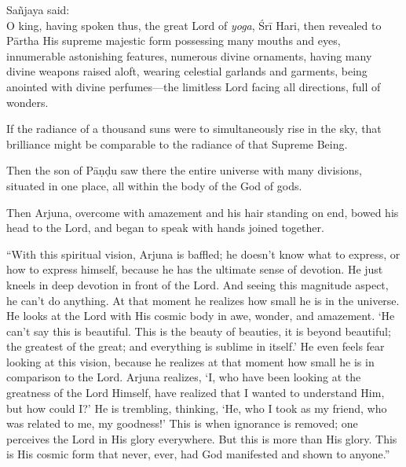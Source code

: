 {\hspace*{1em}Sañjaya said: \\
O king, having spoken thus, the great Lord of \textit{yoga}, Śrī Hari, then revealed to Pārtha His supreme majestic form possessing many mouths and eyes, innumerable astonishing features, numerous divine ornaments, having many divine weapons raised aloft, wearing celestial garlands and garments, being anointed with divine perfumes---the limitless Lord facing all directions, full of wonders.}

{If the radiance of a thousand suns were to simultaneously rise in the sky, that brilliance might be comparable to the radiance of that Supreme Being.}

{Then the son of Pāṇḍu saw there the entire universe with many divisions, situated in one place, all within the body of the God of gods.}

{Then Arjuna, overcome with amazement and his hair standing on end, bowed his head to the Lord, and began to speak with hands joined together.}

\enquote{With this spiritual vision, Arjuna is baffled; he doesn’t know what to express, or how to express himself, because he has the ultimate sense of devotion. He just kneels in deep devotion in front of the Lord. And seeing this magnitude aspect, he can’t do anything. At that moment he realizes how small he is in the universe. He looks at the Lord with His cosmic body in awe, wonder, and amazement. \enquote{He can’t say this is beautiful. This is the beauty of beauties, it is beyond beautiful; the greatest of the great; and everything is sublime in itself.} He even feels fear looking at this vision, because he realizes at that moment how small he is in comparison to the Lord. Arjuna realizes, \enquote{I, who have been looking at the greatness of the Lord Himself, have realized that I wanted to understand Him, but how could I?} He is trembling, thinking, \enquote{He, who I took as my friend, who was related to me, my goodness!} This is when ignorance is removed; one perceives the Lord in His glory everywhere. But this is more than His glory. This is His cosmic form that never, ever, had God manifested and shown to anyone.}


